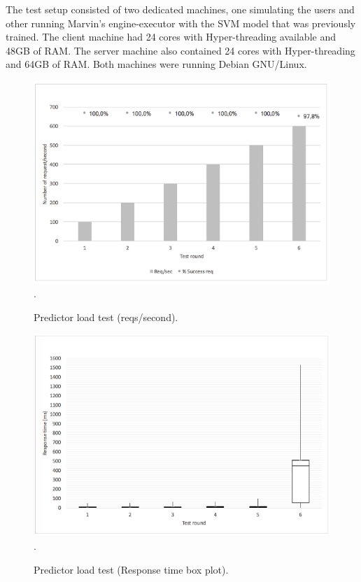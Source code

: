 \documentclass[twoside,11pt]{article}
\begin{document}
The test setup consisted of two dedicated machines, one simulating the users and other running Marvin's engine-executor with the SVM model that was previously trained. The client machine had 24 cores with Hyper-threading available and 48GB of RAM. The server machine also contained 24 cores with Hyper-threading and 64GB of RAM. Both machines were running Debian GNU/Linux.

\begin{figure}[h]
\centering
\includegraphics[scale=1]{fig/performance_1.png}
\DeclareGraphicsExtensions.
\caption{Predictor load test (reqs/second).}
\label{fig_load}
\end{figure}

\begin{figure}[h]
\centering
\includegraphics[scale=1]{fig/performance_2.png}
\DeclareGraphicsExtensions.
\caption{Predictor load test (Response time box plot).}
\label{fig_load_2}
\end{figure}
\end{document}
